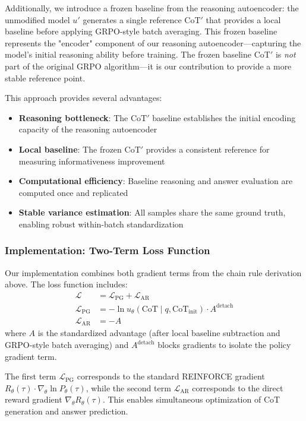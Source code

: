 \documentclass[letterpaper]{article} %
\begin{document}
Additionally, we introduce a frozen baseline from the reasoning autoencoder: the unmodified model $u'$ generates a single reference $\text{CoT}'$ that provides a local baseline before applying GRPO-style batch averaging. This frozen baseline represents the "encoder" component of our reasoning autoencoder—capturing the model's initial reasoning ability before training. The frozen baseline $\text{CoT}'$ is \emph{not} part of the original GRPO algorithm—it is our contribution to provide a more stable reference point.

This approach provides several advantages:
\begin{itemize}
    \item \textbf{Reasoning bottleneck}: The $\text{CoT}'$ baseline establishes the initial encoding capacity of the reasoning autoencoder
    \item \textbf{Local baseline}: The frozen $\text{CoT}'$ provides a consistent reference for measuring informativeness improvement
    \item \textbf{Computational efficiency}: Baseline reasoning and answer evaluation are computed once and replicated
    \item \textbf{Stable variance estimation}: All samples share the same ground truth, enabling robust within-batch standardization
\end{itemize}

\subsubsection{Implementation: Two-Term Loss Function}
\label{subsubsec:actor_rewards}
Our implementation combines both gradient terms from the chain rule derivation above. The loss function includes:
\begin{align}
\mathcal{L} &= \mathcal{L}_{\text{PG}} + \mathcal{L}_{\text{AR}} \\
\mathcal{L}_{\text{PG}} &= -\ln u_\theta(\text{CoT} \mid q, \text{CoT}_{\text{init}}) \cdot A^{\text{detach}} \\
\mathcal{L}_{\text{AR}} &= -A
\end{align}
where $A$ is the standardized advantage (after local baseline subtraction and GRPO-style batch averaging) and $A^{\text{detach}}$ blocks gradients to isolate the policy gradient term. 

The first term $\mathcal{L}_{\text{PG}}$ corresponds to the standard REINFORCE gradient $R_\theta(\tau) \cdot \nabla_\theta \ln P_\theta(\tau)$, while the second term $\mathcal{L}_{\text{AR}}$ corresponds to the direct reward gradient $\nabla_\theta R_\theta(\tau)$. This enables simultaneous optimization of CoT generation and answer prediction.
\end{document}
